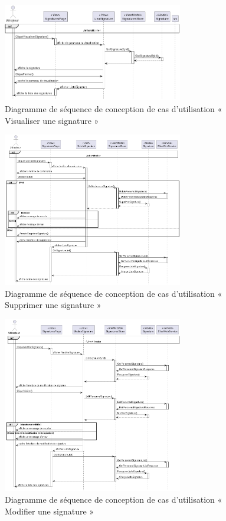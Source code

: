 \begin{figure}[H]
  \centering
  \includegraphics[width=0.7\textwidth]{out/diagrams/signatures/sequence_view/sequence_view_signature}
  \caption{Diagramme de séquence de conception de cas d'utilisation « Visualiser une signature  »}
  \label{fig:sequence_conception_view_signature}
\end{figure}

\begin{figure}[H]
  \centering
  \includegraphics[width=0.7\textwidth]{out/diagrams/signatures/sequence_delete/sequence_delete_signature}
  \caption{Diagramme de séquence de conception de cas d'utilisation « Supprimer une signature  »}
  \label{fig:sequence_conception_delete_signature}
\end{figure}

\begin{figure}[H]
  \centering
  \includegraphics[width=0.7\textwidth]{out/diagrams/signatures/sequence_update/sequence_update_signature}
  \caption{Diagramme de séquence de conception de cas d'utilisation « Modifier une signature  »}
  \label{fig:sequence_conception_update_signature}
\end{figure}

